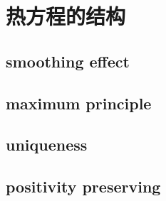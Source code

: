 \section{热方程的结构}
\label{b2:sec:1203}


\subsection{smoothing effect}
\label{b2:subsec:120301}

\subsection{maximum principle}
\label{b2:subsec:120302}

\subsection{uniqueness}
\label{b2:subsec:120303}

\subsection{positivity preserving}
\label{b2:subsec:120304}


